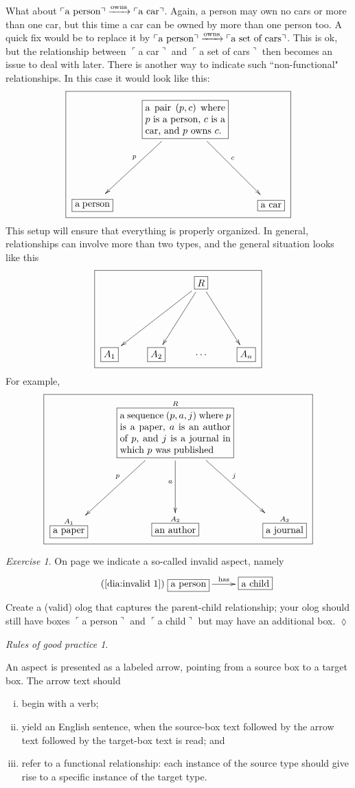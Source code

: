\documentclass{book}
\def\tn{\textnormal}
\newcommand{\LA}[2]{\ar[#1]^-{\tn {#2}}}
\newcommand{\obox}[3]{\stackrel{#1}{\fbox{\parbox{#2}{#3}}}}
\newcommand{\labox}[2]{\obox{#1}{1.6in}{#2}}
\newcommand{\smbox}[2]{\stackrel{#1}{\fbox{#2}}}
\newcommand{\fakebox}[1]{\tn{$\ulcorner$#1$\urcorner$}}
\newcommand{\To}[1]{\xrightarrow{#1}}
\theoremstyle{remark}
\newtheorem{rules}[subsubsection]{Rules of good practice}
\newtheorem{exc}[subsubsection]{Exercise}
\newenvironment{exercise}{\begin{exc}}{\hspace*{\fill}$\lozenge$\end{exc}}
\theoremstyle{definition}
\begin{document}
What about $\fakebox{a person}\To{\tn{owns}}\fakebox{a car}$. Again, a person may own no cars or more than one car, but this time a car can be owned by more than one person too. A quick fix would be to replace it by $\fakebox{a person}\To{\tn{owns}}\fakebox{a set of cars}$.   This is ok, but the relationship between \fakebox{a car} and \fakebox{a set of cars} then becomes an issue to deal with later.  There is another way to indicate such ``non-functional" relationships. In this case it would look like this:
$$
\fbox{\xymatrix{&\obox{}{1.15in}{a pair $(p,c)$ where $p$ is a person, $c$ is a car, and $p$ owns $c$.}\ar[ddl]_p\ar[ddr]^c\\\\
\obox{}{.5in}{a person}&&\obox{}{.3in}{a car}}}
$$
This setup will ensure that everything is properly organized. In general, relationships can involve more than two types, and the general situation looks like this $$\fbox{\xymatrixnocompile{&&\fbox{$R$}\ar[ddll]\ar[ddl]\ar[ddr]\\\\\fbox{$A_1$}&\fbox{$A_2$}&\cdots&\fbox{$A_n$}}}$$  For example, $$\fbox{\xymatrixnocompile{&\labox{R}{a sequence $(p,a,j)$ where $p$ is a paper, $a$ is an author of $p$, and $j$ is a journal in which $p$ was published}\ar[ddl]_p\ar[dd]_a\ar[ddr]^j\\\\\smbox{A_1}{a paper}&\smbox{A_2}{an author}&\smbox{A_3}{a journal}}}$$ 

\begin{exercise}
On page \pageref{dia:invalid 1} we indicate a so-called invalid aspect, namely 
\begin{align}\tag{\ref{dia:invalid 1}}\xymatrixnocompile{\fbox{a person}\LA{r}{has}&\fbox{a child}}
\end{align}
Create a (valid) olog that captures the parent-child relationship; your olog should still have boxes \fakebox{a person} and \fakebox{a child} but may have an additional box.
\end{exercise}

\begin{rules}\label{rules:aspects}

An aspect is presented as a labeled arrow, pointing from a source box to a target box.  The arrow text should

\begin{enumerate}[(i)]
\item begin with a verb;
\item yield an English sentence, when the source-box text followed by the arrow text followed by the target-box text is read; and
\item refer to a functional relationship: each instance of the source type should give rise to a specific instance of the target type.
\end{enumerate}

\end{rules}
\end{document}
